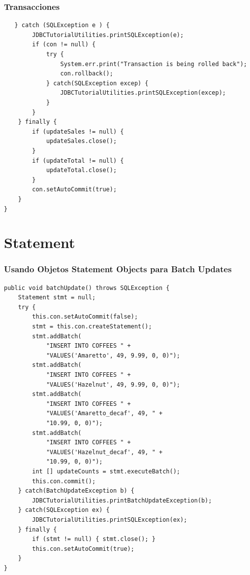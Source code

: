 \documentclass{beamer}
\begin{document}
\begin{frame}[fragile]
\frametitle{Transacciones}
\begin{footnotesize}
\begin{verbatim}
   } catch (SQLException e ) {
        JDBCTutorialUtilities.printSQLException(e);
        if (con != null) {
            try {
                System.err.print("Transaction is being rolled back");
                con.rollback();
            } catch(SQLException excep) {
                JDBCTutorialUtilities.printSQLException(excep);
            }
        }
    } finally {
        if (updateSales != null) {
            updateSales.close();
        }
        if (updateTotal != null) {
            updateTotal.close();
        }
        con.setAutoCommit(true);
    }
}
\end{verbatim}
\end{footnotesize}
\end{frame}


\section{Statement}
\begin{frame}[fragile]
\frametitle{Usando Objetos Statement Objects para Batch Updates}
\begin{tiny}
\begin{verbatim}
public void batchUpdate() throws SQLException {
    Statement stmt = null;
    try {
        this.con.setAutoCommit(false);
        stmt = this.con.createStatement();
        stmt.addBatch(
            "INSERT INTO COFFEES " +
            "VALUES('Amaretto', 49, 9.99, 0, 0)");
        stmt.addBatch(
            "INSERT INTO COFFEES " +
            "VALUES('Hazelnut', 49, 9.99, 0, 0)");
        stmt.addBatch(
            "INSERT INTO COFFEES " +
            "VALUES('Amaretto_decaf', 49, " +
            "10.99, 0, 0)");
        stmt.addBatch(
            "INSERT INTO COFFEES " +
            "VALUES('Hazelnut_decaf', 49, " +
            "10.99, 0, 0)");
        int [] updateCounts = stmt.executeBatch();
        this.con.commit();
    } catch(BatchUpdateException b) {
        JDBCTutorialUtilities.printBatchUpdateException(b);
    } catch(SQLException ex) {
        JDBCTutorialUtilities.printSQLException(ex);
    } finally {
        if (stmt != null) { stmt.close(); }
        this.con.setAutoCommit(true);
    }
}
\end{verbatim}
\end{tiny}
\end{frame}
\end{document}
